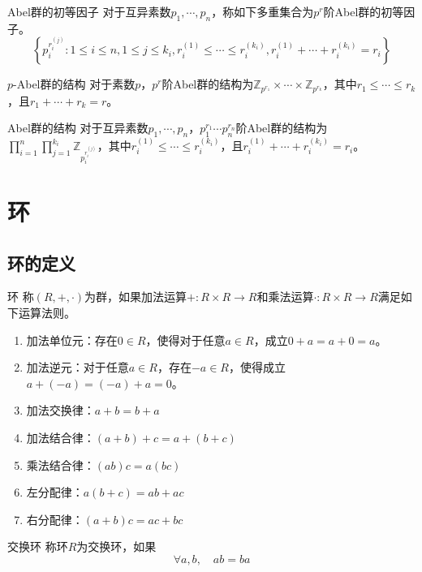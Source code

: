 \documentclass[lang = cn, scheme = chinese, thmcnt = section]{elegantbook}
\begin{document}
\begin{definition}{Abel群的初等因子}
	对于互异素数$p_1,\cdots,p_n$，称如下多重集合为$p^r$阶Abel群的初等因子。
	$$
	\left\{ p_{i}^{r_{i}^{(j)}}:1\le i\le n,1\le j\le k_i,r_i^{(1)}\le\cdots\le r_i^{(k_i)},r_i^{(1)}+\cdots+r_i^{(k_i)}=r_i \right\}
	$$
\end{definition}

\begin{theorem}{$p$-Abel群的结构}
	对于素数$p$，$p^r$阶Abel群的结构为$\mathbb{Z}_{p^{r_1}}\times \cdots\times\mathbb{Z}_{p^{r_k}}$，其中$r_1\le\cdots\le r_k$，且$r_1+\cdots +r_k=r$。
\end{theorem}

\begin{theorem}{Abel群的结构}
	对于互异素数$p_1,\cdots,p_n$，$p_1^{r_1}\cdots p_n^{r_n}$阶Abel群的结构为$\displaystyle \prod_{i=1}^{n}\prod_{j=1}^{k_i}\mathbb{Z}_{p_{i}^{r_{i}^{(j)}}}$，其中$r_i^{(1)}\le\cdots\le r_i^{(k_i)}$，且$r_i^{(1)}+\cdots+r_i^{(k_i)}=r_i$。
\end{theorem}

\chapter{环}

\section{环的定义}

\begin{definition}{环}
	称$(R,+,\cdot)$为群，如果加法运算$+:R\times R\to R$和乘法运算$\cdot :R\times R\to R$满足如下运算法则。
	\begin{enumerate}
		\item 加法单位元：存在$0\in R$，使得对于任意$a\in R$，成立$0+a=a+0=a$。
		\item 加法逆元：对于任意$a\in R$，存在$-a\in R$，使得成立$a+(-a)=(-a)+a=0$。
		\item 加法交换律：$a+b=b+a$
		\item 加法结合律：$(a+b)+c=a+(b+c)$
		\item 乘法结合律：$(ab)c=a(bc)$
		\item 左分配律：$a(b+c)=ab+ac$
		\item 右分配律：$(a+b)c=ac+bc$
	\end{enumerate}
\end{definition}

\begin{definition}{交换环}
	称环$R$为交换环，如果
	$$
	\forall a,b,\quad ab=ba
	$$
\end{definition}
\end{document}
